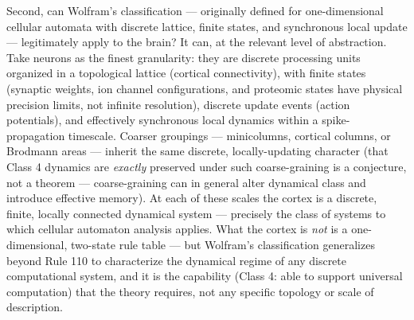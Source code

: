 \documentclass[12pt]{article}
\begin{document}
Second, can Wolfram's classification --- originally defined for one-dimensional cellular automata with discrete lattice, finite states, and synchronous local update --- legitimately apply to the brain? It can, at the relevant level of abstraction. Take neurons as the finest granularity: they are discrete processing units organized in a topological lattice (cortical connectivity), with finite states (synaptic weights, ion channel configurations, and proteomic states have physical precision limits, not infinite resolution), discrete update events (action potentials), and effectively synchronous local dynamics within a spike-propagation timescale. Coarser groupings --- minicolumns, cortical columns, or Brodmann areas --- inherit the same discrete, locally-updating character (that Class 4 dynamics are \emph{exactly} preserved under such coarse-graining is a conjecture, not a theorem --- coarse-graining can in general alter dynamical class and introduce effective memory). At each of these scales the cortex is a discrete, finite, locally connected dynamical system --- precisely the class of systems to which cellular automaton analysis applies. What the cortex is \emph{not} is a one-dimensional, two-state rule table --- but Wolfram's classification generalizes beyond Rule 110 to characterize the dynamical regime of any discrete computational system, and it is the capability (Class 4: able to support universal computation) that the theory requires, not any specific topology or scale of description.
\end{document}
